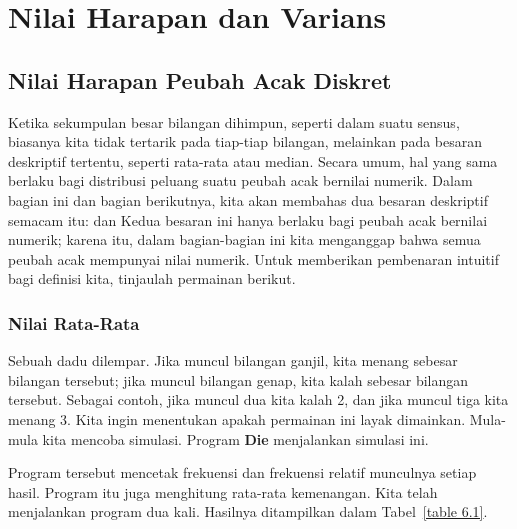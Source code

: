 

\chapter{Nilai Harapan dan Varians}\label{chp 6}

\section[Nilai Harapan]{Nilai Harapan Peubah Acak Diskret}\label{sec 6.1}

Ketika sekumpulan besar bilangan dihimpun, seperti dalam suatu sensus, biasanya kita
tidak tertarik pada tiap-tiap bilangan, melainkan pada besaran deskriptif tertentu,
seperti rata-rata atau median. Secara umum, hal yang sama berlaku bagi distribusi
peluang suatu peubah acak bernilai numerik. Dalam bagian ini dan bagian berikutnya,
kita akan membahas dua besaran deskriptif semacam itu:  dan
 Kedua besaran ini hanya berlaku bagi peubah acak bernilai numerik;
karena itu, dalam bagian-bagian ini kita menganggap bahwa semua peubah acak mempunyai
nilai numerik. Untuk memberikan pembenaran intuitif bagi definisi kita, tinjaulah
permainan berikut.

\subsection*{Nilai Rata-Rata}

Sebuah dadu dilempar. Jika muncul bilangan ganjil, kita menang sebesar bilangan
tersebut; jika muncul bilangan genap, kita kalah sebesar bilangan tersebut. Sebagai
contoh, jika muncul dua kita kalah 2, dan jika muncul tiga kita menang 3. Kita ingin
menentukan apakah permainan ini layak dimainkan. Mula-mula kita mencoba simulasi.
Program {\bf Die} menjalankan simulasi ini.
\par
Program tersebut mencetak frekuensi dan frekuensi relatif munculnya setiap hasil.
Program itu juga menghitung rata-rata kemenangan. Kita telah menjalankan program dua
kali. Hasilnya ditampilkan dalam Tabel~\ref{table 6.1}.

